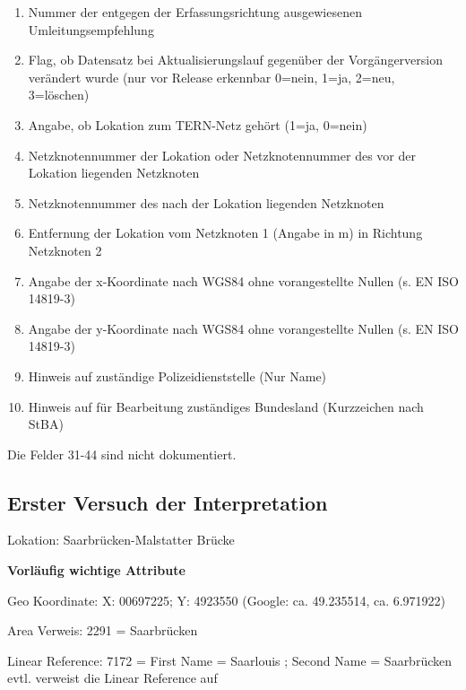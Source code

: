 \documentclass[12pt, a4paper, ngerman]{article}
\begin{document}
\begin{enumerate}
	\item Nummer der entgegen der Erfassungsrichtung ausgewiesenen Umleitungsempfehlung
	\item Flag, ob Datensatz bei Aktualisierungslauf gegenüber der Vorgängerversion verändert wurde (nur vor Release erkennbar 0=nein, 1=ja, 2=neu, 3=löschen)
	\item Angabe, ob Lokation zum TERN-Netz gehört (1=ja, 0=nein)
	\item Netzknotennummer der Lokation oder Netzknotennummer des vor der Lokation liegenden Netzknoten
	\item Netzknotennummer des nach der Lokation liegenden Netzknoten
	\item Entfernung der Lokation vom Netzknoten 1 (Angabe in m) in Richtung Netzknoten 2
	\item Angabe der x-Koordinate nach WGS84 ohne vorangestellte Nullen (s. EN ISO 14819-3)
	\item Angabe der y-Koordinate nach WGS84 ohne vorangestellte Nullen (s. EN ISO 14819-3)
	\item Hinweis auf zuständige Polizeidienststelle (Nur Name)
	\item Hinweis auf für Bearbeitung zuständiges Bundesland (Kurzzeichen nach StBA) 
	
	
\end{enumerate}	

Die Felder 31-44 sind nicht dokumentiert.

\subsection{Erster Versuch der Interpretation}
Lokation: Saarbrücken-Malstatter Brücke

\textbf{Vorläufig wichtige Attribute}

Geo Koordinate: X: 00697225; Y: 4923550  (Google: ca. 49.235514, ca. 6.971922)

Area Verweis: 2291 = Saarbrücken

Linear Reference:  7172 =  First Name = Saarlouis ; Second Name = Saarbrücken evtl. verweist die Linear Reference auf 

\newpage
\listoffigures
\end{document}
